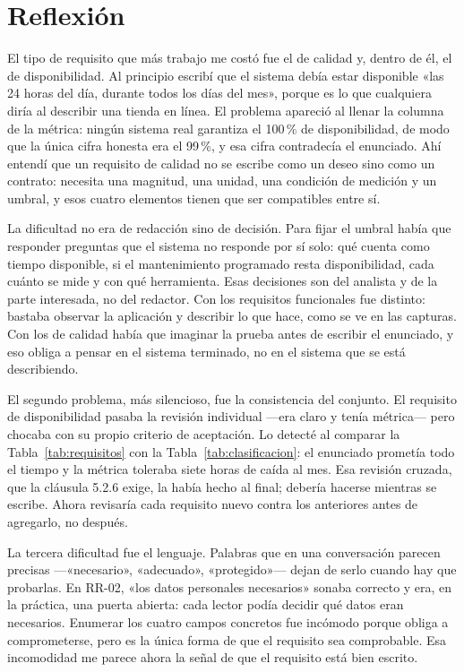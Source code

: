 \documentclass[11pt,a4paper]{article}
\begin{document}
\section{Reflexión}
\label{sec:reflexion}

El tipo de requisito que más trabajo me costó fue el de calidad y, dentro de
él, el de disponibilidad. Al principio escribí que el sistema debía estar
disponible «las 24 horas del día, durante todos los días del mes», porque es
lo que cualquiera diría al describir una tienda en línea. El problema
apareció al llenar la columna de la métrica: ningún sistema real garantiza
el 100\,\% de disponibilidad, de modo que la única cifra honesta era el
99\,\%, y esa cifra contradecía el enunciado. Ahí entendí que un requisito
de calidad no se escribe como un deseo sino como un contrato: necesita una
magnitud, una unidad, una condición de medición y un umbral, y esos cuatro
elementos tienen que ser compatibles entre sí.

La dificultad no era de redacción sino de decisión. Para fijar el umbral
había que responder preguntas que el sistema no responde por sí solo: qué
cuenta como tiempo disponible, si el mantenimiento programado resta
disponibilidad, cada cuánto se mide y con qué herramienta. Esas decisiones
son del analista y de la parte interesada, no del redactor. Con los
requisitos funcionales fue distinto: bastaba observar la aplicación y
describir lo que hace, como se ve en las capturas. Con los de calidad había
que imaginar la prueba antes de escribir el enunciado, y eso obliga a pensar
en el sistema terminado, no en el sistema que se está describiendo.

El segundo problema, más silencioso, fue la consistencia del conjunto. El
requisito de disponibilidad pasaba la revisión individual ---era claro y tenía
métrica--- pero chocaba con su propio criterio de aceptación. Lo detecté al
comparar la Tabla~\ref{tab:requisitos} con la Tabla~\ref{tab:clasificacion}:
el enunciado prometía todo el tiempo y la métrica toleraba siete horas de
caída al mes. Esa revisión cruzada, que la cláusula 5.2.6 exige, la había
hecho al final; debería hacerse mientras se escribe. Ahora revisaría cada
requisito nuevo contra los anteriores antes de agregarlo, no después.

La tercera dificultad fue el lenguaje. Palabras que en una conversación
parecen precisas ---«necesario», «adecuado», «protegido»--- dejan de serlo
cuando hay que probarlas. En RR-02, «los datos personales necesarios»
sonaba correcto y era, en la práctica, una puerta abierta: cada lector podía
decidir qué datos eran necesarios. Enumerar los cuatro campos concretos fue
incómodo porque obliga a comprometerse, pero es la única forma de que el
requisito sea comprobable. Esa incomodidad me parece ahora la señal de que
el requisito está bien escrito.
\end{document}

